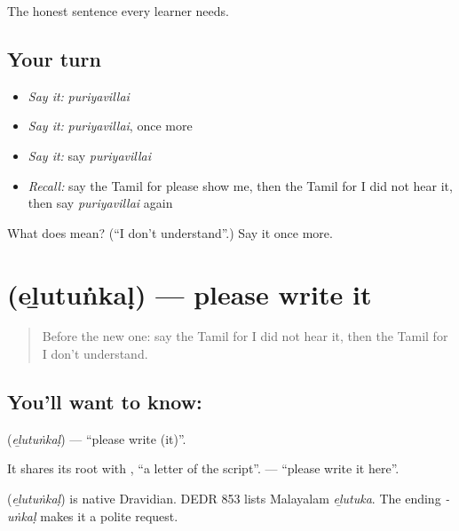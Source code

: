 \begin{grammarlens}[title={What you've built}]
The honest sentence every learner needs.
\end{grammarlens}

\subsection*{Your turn}
\begin{itemize}
\raggedright
  \item \emph{Say it:} \emph{puriyavillai}
  \item \emph{Say it:} \emph{puriyavillai}, once more
  \item \emph{Say it:} say \emph{puriyavillai}
  \item \emph{Recall:} say the Tamil for please show me, then the Tamil for I did not hear it, then say \emph{puriyavillai} again
\end{itemize}

\begin{tcolorbox}[breakable,colback=teal!4,colframe=teal!35!black,title={Before you move on}]
What does  mean? (\textquotedblleft{}I don't understand\textquotedblright{}.) Say it once more.
\end{tcolorbox}
\section[\texorpdfstring{\ta{எழுதுங்கள்} (eḻutuṅkaḷ)}{எழுதுங்கள் (eḻutuṅkaḷ)}]{ (eḻutuṅkaḷ) — please write it}

\label{lesson:TA-C94-write}



\begin{quote}
Before the new one: say the Tamil for I did not hear it, then the Tamil for I don't understand.
\end{quote}

\subsection*{You'll want to know: }
\textbf{} (\emph{eḻutuṅkaḷ}) — \textquotedblleft{}please write (it)\textquotedblright{}.

It shares its root with \textbf{}, \textquotedblleft{}a letter of the script\textquotedblright{}. \textbf{ } — \textquotedblleft{}please write it here\textquotedblright{}.

\begin{cousinweb}
\textbf{} (\emph{eḻutuṅkaḷ}) is native Dravidian. DEDR 853 lists Malayalam \emph{eḻutuka}. The ending \emph{-uṅkaḷ} makes it a polite request.
\end{cousinweb}

